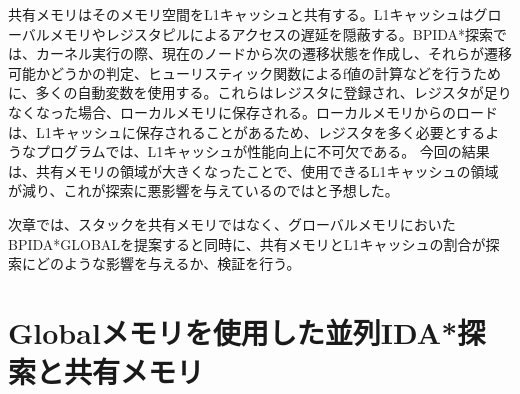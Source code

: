 \documentclass[a4paper,11pt,oneside,openany]{jsbook}
\begin{document}
共有メモリはそのメモリ空間をL1キャッシュと共有する。L1キャッシュはグローバルメモリやレジスタピルによるアクセスの遅延を隠蔽する。BPIDA*探索では、カーネル実行の際、現在のノードから次の遷移状態を作成し、それらが遷移可能かどうかの判定、ヒューリスティック関数によるf値の計算などを行うために、多くの自動変数を使用する。これらはレジスタに登録され、レジスタが足りなくなった場合、ローカルメモリに保存される。ローカルメモリからのロードは、L1キャッシュに保存されることがあるため、レジスタを多く必要とするようなプログラムでは、L1キャッシュが性能向上に不可欠である。
今回の結果は、共有メモリの領域が大きくなったことで、使用できるL1キャッシュの領域が減り、これが探索に悪影響を与えているのではと予想した。

次章では、スタックを共有メモリではなく、グローバルメモリにおいたBPIDA*GLOBALを提案すると同時に、共有メモリとL1キャッシュの割合が探索にどのような影響を与えるか、検証を行う。






\chapter{Globalメモリを使用した並列IDA*探索と共有メモリ}
\end{document}
